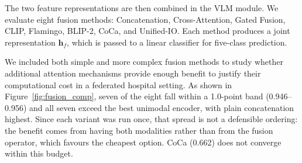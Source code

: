 \documentclass[letterpaper, conference]{IEEEtran}
\begin{document}
The two feature representations are then combined in the VLM module. We evaluate eight fusion methods: Concatenation, Cross-Attention, Gated Fusion, CLIP, Flamingo, BLIP-2, CoCa, and Unified-IO. Each method produces a joint representation $\mathbf{h}_f$, which is passed to a linear classifier for five-class prediction.

We included both simple and more complex fusion methods to study whether additional attention mechanisms provide enough benefit to justify their computational cost in a federated hospital setting. As shown in Figure~\ref{fig:fusion_comp}, seven of the eight fall within a 1.0-point band (0.946--0.956) and all seven exceed the best unimodal encoder, with plain concatenation highest. Since each variant was run once, that spread is not a defensible ordering: the benefit comes from having both modalities rather than from the fusion operator, which favours the cheapest option. CoCa (0.662) does not converge within this budget.


\end{document}
